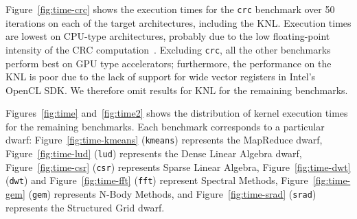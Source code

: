 \documentclass[../document.tex]{subfiles}
\begin{document}
Figure~\ref{fig:time-crc} shows the execution times for the {\tt crc} benchmark over 50 iterations on each of the target architectures, including the KNL.
Execution times are lowest on CPU-type architectures, probably due to the low floating-point intensity of the CRC computation~\cite[Ch. 6]{joshi2016thesis}.
Excluding {\tt crc}, all the other benchmarks perform best on GPU type accelerators; furthermore, the performance on the KNL is poor due to the lack of support for wide vector registers in Intel's OpenCL SDK.
We therefore omit results for KNL for the remaining benchmarks.


Figures~\ref{fig:time} and~\ref{fig:time2} shows the distribution of kernel execution times for the remaining benchmarks.
Each benchmark corresponds to a particular dwarf: 
Figure~\ref{fig:time-kmeans} ({\tt kmeans}) represents the MapReduce dwarf,
Figure~\ref{fig:time-lud} ({\tt lud}) represents the Dense Linear Algebra dwarf,
Figure~\ref{fig:time-csr} ({\tt csr}) represents Sparse Linear Algebra, 
Figure~\ref{fig:time-dwt} ({\tt dwt}) and Figure~\ref{fig:time-fft} ({\tt fft}) represent Spectral Methods,
Figure~\ref{fig:time-gem} ({\tt gem}) represents N-Body Methods, 
and Figure~\ref{fig:time-srad} ({\tt srad}) represents the Structured Grid dwarf.

\captionsetup[subfigure]{justification=raggedright,singlelinecheck=false}
\end{document}
